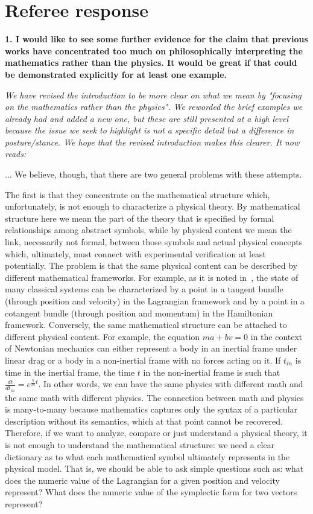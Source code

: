 \documentclass[11pt]{article}
\begin{document}
\section*{Referee response}

\textbf{1. I would like to see some further evidence for the claim that previous works have concentrated too much on philosophically interpreting the mathematics rather than the physics. It would be great if that could be demonstrated explicitly for at least one example.}

\emph{We have revised the introduction to be more clear on what we mean by "focusing on the mathematics rather than the physics". We reworded the brief examples we already had and added a new one, but these are still presented at a high level because the issue we seek to highlight is not a specific detail but a difference in posture/stance. We hope that the revised introduction makes this clearer. It now reads:}

... We believe, though, that there are two general problems with these attempts.

The first is that they concentrate on the mathematical structure which, unfortunately, is not enough to characterize a physical theory. By mathematical structure here we mean the part of the theory that is specified by formal relationships among abstract symbols, while by physical content we mean the link, necessarily not formal, between those symbols and actual physical concepts which, ultimately, must connect with experimental verification at least potentially. The problem is that the same physical content can be described by different mathematical frameworks. For example, as it is noted in~\cite{North,Curiel,Barrett1,Barrett2}, the state of many classical systems can be characterized by a point in a tangent bundle (through position and velocity) in the Lagrangian framework and by a point in a cotangent bundle (through position and momentum) in the Hamiltonian framework. Conversely, the same mathematical structure can be attached to different physical content. For example, the equation $ma + bv = 0$ in the context of Newtonian mechanics can either represent a body in an inertial frame under linear drag or a body in a non-inertial frame with no forces acting on it. If $t_{in}$ is time in the inertial frame, the time $t$ in the non-inertial frame is such that  $\frac{dt}{dt_{in}} = e^{\frac{b}{m}t}$. In other words, we can have the same physics with different math and the same math with different physics. The connection between math and physics is many-to-many because mathematics captures only the syntax of a particular description without its semantics, which at that point cannot be recovered. Therefore, if we want to analyze, compare or just understand a physical theory, it is not enough to understand the mathematical structure: we need a clear dictionary as to what each mathematical symbol ultimately represents in the physical model. That is, we should be able to ask simple questions such as: what does the numeric value of the Lagrangian for a given position and velocity represent? What does the numeric value of the symplectic form for two vectors represent?
\end{document}
